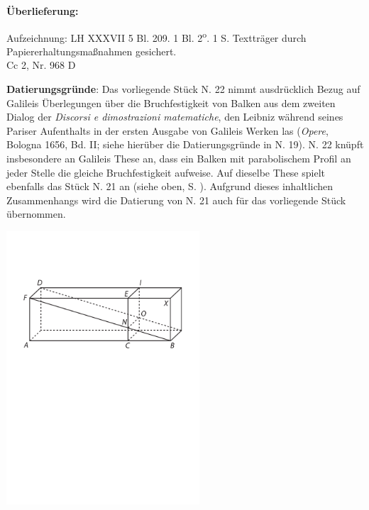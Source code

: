 \begin{ledgroupsized}[r]{120mm}
\footnotesize 
\pstart                
\noindent\textbf{\"{U}berlieferung:}   
\pend
\end{ledgroupsized}
\begin{ledgroupsized}[r]{114mm}
\footnotesize 
\pstart \parindent -6mm
%
Aufzeichnung: LH XXXVII 5 Bl. 209. 1 Bl. 2\textsuperscript{o}. 1  S. Textträger durch Papiererhaltungs\-maßnahmen gesichert.\\%
Cc 2, Nr. 968 D
\pend
\end{ledgroupsized}
%
\vspace{5mm}
\begin{ledgroup}
\footnotesize 
\pstart
\noindent\footnotesize{\textbf{Datierungsgr\"{u}nde}:
Das vorliegende Stück N. 22 %
nimmt ausdrücklich Bezug auf Galileis\protect{} Überlegungen über die Bruchfestigkeit von Balken aus dem zweiten Dialog der \textit{Discorsi e dimostrazioni matematiche},
den Leibniz während seines Pariser Aufenthalts in der ersten Ausgabe von Galileis Werken las (\cite{01084}\textit{Opere}, Bologna 1656, Bd. II;
siehe hierüber die Datierungsgründe in N. 19). %
N. 22 %
knüpft insbesondere an Galileis These an,
dass ein Balken mit parabolischem Profil an jeder Stelle die gleiche Bruchfestigkeit auf\-weise.
Auf dieselbe These spielt ebenfalls das Stück N. 21 %
an (siehe oben, S. ).
Aufgrund dieses inhaltlichen Zusammenhangs wird die Datierung von N. 21 %
auch für das vorliegende Stück übernommen.}
\pend
\count{}
\count{}
\count{}
\end{ledgroup}
%
\vspace{5mm}
\pstart%
\noindent[209~r\textsuperscript{o}]
\pend
\pstart
\normalsize  
\vspace{-2mm}
\centering
\includegraphics[width=0.54\textwidth]{images/lh03705_209r-d1.pdf}\\
